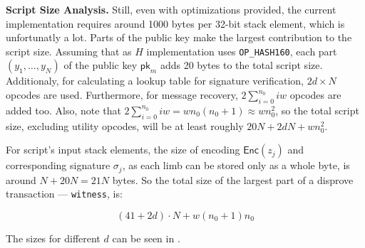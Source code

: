 \documentclass{iacrtrans}
\begin{document}
\textbf{Script Size Analysis.} Still, even with optimizations
provided, the current implementation requires around 1000 bytes per
32-bit stack element, which is unfortunatly a lot. Parts of the public
key make the largest contribution to the script size. Assuming that as
$H$ implementation uses \texttt{OP\_HASH160}, each part
$(y_1,\dots,y_N)$ of the public key $\mathsf{pk}_{m}$ adds 20 bytes to
the total script size. Additionaly, for calculating a lookup table for
signature verification, $2d \times N$ opcodes are used. Furthermore, for
message recovery, $2\sum_{i = 0}^{n_0} i w$ opcodes are added too. Also,
note that $2 \sum_{i = 0}^{n_0} i w = w n_0 (n_0+1) \approx w n_0^2$, so the
total script size, excluding utility opcodes, will be at least roughly
$20N + 2 dN + w n_0^2$.

For script's input stack elements, the size of encoding
$\mathsf{Enc}(z_j)$ and corresponding signature $\sigma_j$, as each limb
can be stored only as a whole byte, is around $N + 20N = 21N$
bytes. So the total size of the largest part of a disprove transaction
--- \texttt{witness}, is:

\begin{equation*}\label{eq:contrbution-script-size}
  (41 + 2 d) \cdot N + w (n_0 + 1)n_0
\end{equation*}

The sizes for different $d$ can be seen in
.
\end{document}
